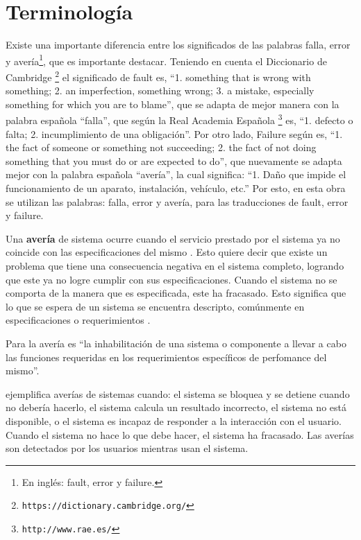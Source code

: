 \section{Terminología}\label{sec:terminologia}
Existe una importante diferencia entre los significados de las palabras falla, error y
avería\footnote{En inglés: fault, error y failure.}, que es importante destacar. Teniendo en cuenta 
el Diccionario de Cambridge \citep{CambridgeDictionary}\footnote{\texttt{{https://dictionary.cambridge.org/}}}
el significado de fault es, ``1. something that is wrong with something; 2. an imperfection, something wrong;
3. a mistake, especially something for which you are to blame'', 
que se adapta de mejor manera con la palabra española ``falla'', que según la Real Academia Española \citep{RAE}\footnote{\texttt{{http://www.rae.es/}}} es, ``1. defecto o falta; 2. incumplimiento de una
obligación''.  Por otro lado, Failure según \cite{CambridgeDictionary} es, ``1. the fact of someone or something not succeeding; 2. the fact of not doing something that you must do or are expected to do'', que 
nuevamente se adapta mejor con la palabra española ``avería'', la cual significa: ``1. Daño que impide el funcionamiento de un aparato, instalación, vehículo, etc.'' Por esto, en esta obra se utilizan las palabras: falla, error y avería, para las traducciones de fault, error y failure.

Una \textbf{avería} de sistema ocurre cuando el servicio prestado por el sistema ya no coincide con
las especificaciones del mismo \citep{Hanmer07}. Esto quiere decir que existe un problema que tiene
una consecuencia negativa en el sistema completo, logrando que este ya no logre cumplir con sus
especificaciones. Cuando el sistema no se comporta de la manera que es especificada, este ha
fracasado. Esto significa que lo que se espera de un sistema se encuentra descripto, comúnmente en
especificaciones o requerimientos \citep{Pullum01}.

Para la \cite{IEEE610.12} avería es ``la inhabilitación de una sistema o componente a llevar a
cabo las funciones requeridas en los requerimientos específicos de perfomance del mismo''.

\cite{Hanmer07} ejemplifica averías de sistemas cuando: el sistema se bloquea y se detiene cuando no
debería hacerlo, el sistema calcula un resultado incorrecto, el sistema no está disponible, o el
sistema es incapaz de responder a la interacción con el usuario. Cuando el sistema no hace lo que
debe hacer, el sistema ha fracasado. Las averías son detectados por los usuarios mientras usan el
sistema.

